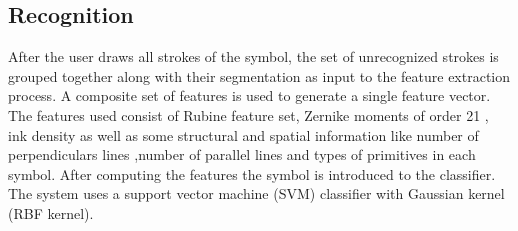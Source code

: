 \documentclass[a4paper,10pt]{IEEEconf}
\begin{document}
\subsection{Recognition}
After the user draws all strokes of the symbol, the set of unrecognized strokes is grouped together along with their segmentation as input to the feature extraction process. A composite set of features is used to generate a single feature vector. The features used consist of Rubine feature set,  Zernike moments of order 21 \cite{HeloiseBeautification}, ink density \cite{GeometryAndDomain102} as well as some structural and spatial information like number of perpendiculars lines ,number of parallel lines and types of primitives in each symbol. After computing the features the symbol is introduced to the classifier. The system uses a support vector machine (SVM) classifier with Gaussian kernel (RBF kernel).%
%
\end{document}
